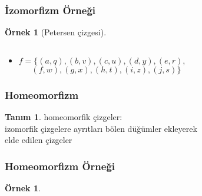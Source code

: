 \documentclass[dvipsnames]{beamer}
\theoremstyle{definition}
\newtheorem{tanim}[theorem]{Tanım}
\theoremstyle{example}
\newtheorem{ornek}[theorem]{Örnek}
\theoremstyle{plain}
\begin{document}
\begin{frame}
  \frametitle{İzomorfizm Örneği}

  \begin{ornek}[Petersen çizgesi]
    \begin{columns}
      \begin{center}
      \end{center}

      \begin{center}
      \end{center}
    \end{columns}

    \pause
    \bigskip
    \begin{itemize}
      \item $f = \{(a,q),(b,v),(c,u),(d,y),(e,r),$\\
        $~~~~~~~(f,w),(g,x),(h,t),(i,z),(j,s)\}$
    \end{itemize}
  \end{ornek}
\end{frame}

\begin{frame}
  \frametitle{Homeomorfizm}

  \begin{tanim}
    \alert{homeomorfik çizgeler}:\\
    izomorfik çizgelere ayrıtları bölen düğümler ekleyerek\\
    elde edilen çizgeler
  \end{tanim}
\end{frame}

\begin{frame}
  \frametitle{Homeomorfizm Örneği}

  \begin{ornek}
    \begin{columns}
      \begin{center}
      \end{center}

      \begin{center}
      \end{center}
    \end{columns}
  \end{ornek}
\end{frame}
\end{document}
